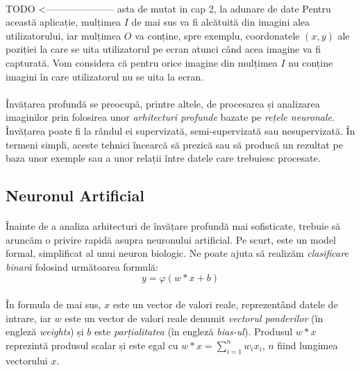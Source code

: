 \paragraph{}
TODO <--------------------- asta de mutat in cap 2, la adunare de date
Pentru această aplicație, mulțimea $I$ de mai sus va fi alcătuită din imagini alea utilizatorului, iar mulțimea $O$ va conține, spre exemplu, coordonatele $(x, y)$ ale poziției la care se uita utilizatorul pe ecran atunci când acea imagine va fi capturată.
Vom considera că pentru orice imagine din mulțimea $I$ nu conține imagini în care utilizatorul nu se uita la ecran.

\paragraph{}
Învățarea profundă se preocupă, printre altele, de procesarea și analizarea imaginilor prin folosirea unor \emph{arhitecturi profunde} bazate pe \emph{rețele neuronale}.
Învățarea poate fi la rândul ei supervizată, semi-supervizată sau nesupervizată.
În termeni simpli, aceste tehnici încearcă să prezică sau să producă un rezultat pe baza unor exemple sau a unor relații între datele care trebuiesc procesate.

\subsection{Neuronul Artificial}
\paragraph{}
Înainte de a analiza arhitecturi de învățare profundă mai sofisticate, trebuie să aruncăm o privire rapidă asupra neuronului artificial.
Pe scurt, este un model formal, simplificat al unui neuron biologic.
Ne poate ajuta să realizăm \emph{clasificare binară} folosind următoarea formulă:
$$
y = \varphi (w * x + b)
$$

\paragraph{}
În formula de mai sus, $x$ este un vector de valori reale, reprezentând datele de intrare, iar $w$ este un vector de valori reale denumit \emph{vectorul ponderilor} (în engleză \emph{weights}) și $b$ este \emph{parțialitatea} (în engleză \emph{bias-ul}).
Produsul $w * x$ reprezintă produsul scalar și este egal cu $w * x = \sum _{i=1}^{n}w_{i}x_{i}$, $n$ fiind lungimea vectorului $x$.

